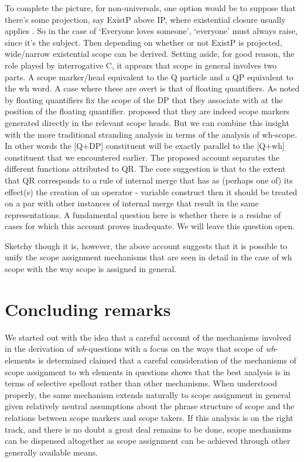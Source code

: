 \documentclass[charis]{glossa}
\begin{document}
To complete the picture, for non-universals, one option would be to  suppose that there's some projection, say ExistP above IP, where existential closure usually applies \citep{kratzer:2005}. So in the case of  `Everyone loves someone', `everyone' must always raise, since it's the subject. Then depending on whether or not ExistP is projected,  wide/narrow existential scope can be derived.  Setting aside, for good reason, the role played by interrogative C, it appears that scope in general involves two parts.  A scope marker/head equivalent to the Q particle and a QP equivalent to the wh word.  A case where these are overt is that of floating quantifiers.  As noted by \citet{dowty-brodie:1984} floating quantifiers fix the scope of the DP that they associate with at the position of the floating quantifier.  \citet{tsoulas:2003} proposed that they are indeed scope markers generated directly in the relevant scope heads.  But we can combine this insight with the more traditional stranding analysis in terms of the analysis of wh-scope.  In other words the [Q+DP] constituent will be exactly parallel to the [Q+wh] constituent that we encountered earlier.
The proposed account separates the different functions attributed to QR. The core suggestion is that to the extent that QR corresponds to a rule of internal merge that has as (perhaps one of) its effect(s) the creation of an operator - variable construct then it should be treated on a par with other instances of internal merge that result in the same representations.  A fundamental question here is whether there is a residue of cases for which this account proves inadequate. We will leave this question open. 

Sketchy though it is, however, the above account suggests that it is possible to unify the scope assignment mechanisms that are seen in detail in the case of wh scope with the way scope is assigned in general.  

\section{Concluding remarks}
We started out with the idea that a  careful account of the mechanisms involved in the derivation of \textit{wh}-questions with a focus on the ways that scope of \textit{wh}-elements is determined   claimed that a careful consideration of the mechanisms of scope assignment to wh elements in questions shows that the best analysis is in terms of selective spellout rather than other mechanisms.  When understood properly, the same mechanism extends naturally to scope assignment in general given relatively neutral assumptions about the phrase structure of scope and the relations between scope markers and scope takers.  If this analysis is on the right track, and there is no doubt a great deal remains to be done, scope mechanisms can be dispensed altogether as scope assignment can be achieved through other generally available means.
\end{document}
